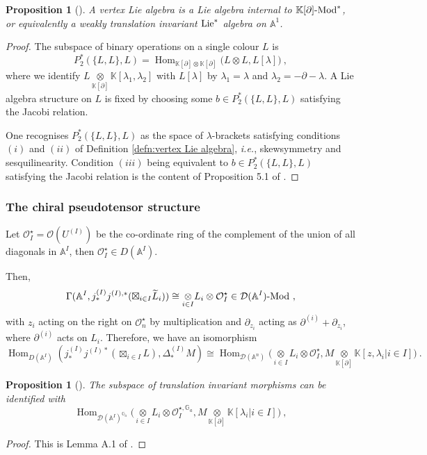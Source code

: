 \documentclass[11pt]{amsart}
\numberwithin{equation}{section}
\newtheorem{prop}[theo]{Proposition}
\theoremstyle{definition}
\newcommand{\bb}{\mathbb}
\newcommand{\mc}{\mathcal}
\DeclareMathOperator{\Hom}{Hom}
\newcommand{\ik}{{\bb K}}
\newcommand{\Lie}{{\textup{Lie}}}
\newcommand{\0}{{\textbf{0}}}
\newcommand{\DD}{{D}}
\def\IA{\mathbb{A}}
\def\IG{\mathbb{G}}
\def\OO{{\mc O}}
\def \ie{{\it i.e.}}
\newcommand{\tensor}[1]{\underset{#1}{\otimes}}
\begin{document}
\begin{prop}[\cite{BD1,BDSHK19}]\label{prop:Lie star is vertex Lie}
	A vertex Lie algebra is a Lie algebra internal to $\ik[\partial]\textup{-Mod}^*$, or equivalently a weakly translation invariant $\Lie^*$ algebra on $\IA^1$.
\end{prop}
\begin{proof}
 The subspace of binary operations on a single colour $L$ is
 \[
 P_2^*(\{L,L\},L) = \Hom_{\ik[\partial]\otimes\ik[\partial]}\big(L\otimes L, L[\lambda]\big)~,
 \]
 where we identify $L\tensor{\ik[\partial]}\ik[\lambda_1,\lambda_2]$ with $L[\lambda]$ by $\lambda_1=\lambda$ and $\lambda_2= -\partial-\lambda$. A Lie algebra structure on $L$ is fixed by choosing some $b\in P_2^*(\{L,L\},L)$ satisfying the Jacobi relation.

 One recognises $P_2^*(\{L,L\},L)$ as the space of $\lambda$-brackets satisfying conditions $(i)$ and $(ii)$ of Definition \ref{defn:vertex Lie algebra}, \ie, skewsymmetry and sesquilinearity. Condition $(iii)$ being equivalent to $b\in P_2^*(\{L,L\},L)$ satisfying the Jacobi relation is the content of Proposition 5.1 of \cite{BDSHK19}.
\end{proof}

\subsubsection{The chiral pseudotensor structure} 
Let $\OO_I^\star= \OO(U^{(I)})$ be the co-ordinate ring of the complement of the union of all diagonals in $\IA^I$, then $\OO_I^\star\in \DD(\IA^I)$.

Then,
\[
\Gamma(\IA^I,j^{(I)}_*j^{(I),*}(\boxtimes_{i\in I} \widetilde{L}_i)) \cong\tensor{i\in I} L_i\otimes \OO_I^{\star}\in \mc{D}(\IA^I)\textup{-Mod}~,
\]
with $z_i$ acting on the right on $\OO_n^\star$ by multiplication and $\partial_{z_i}$ acting as $\partial^{(i)} + \partial_{z_i}$, where $\partial^{(i)}$ acts on $L_i$. Therefore, we have an isomorphism
\[
 \Hom_{D(\IA^I)}(j^{(I)}_*j^{(I)*}(\boxtimes_{i\in I} L),\Delta^{(I)}_*M) \cong \Hom_{{\mc D}(\IA^n)}\big(\tensor{i\in I} L_i\otimes \OO_I^\star, M\tensor{\ik[\partial]}\ik[z,\lambda_i|i\in I]\big)~.
\]

\begin{prop}[\cite{BDSHK19}]
The subspace of translation invariant morphisms can be identified with
\[
 \Hom_{{\mc D}(\IA^I)^{\IG_a}}\big(\tensor{i\in I} L_i\otimes \OO_I^{\star,\IG_a}, M\tensor{\ik[\partial]}\ik[\lambda_i|i\in I]\big)~,
\]
\end{prop}
\begin{proof}
	This is Lemma A.1 of \cite{BDSHK19}.
\end{proof}
\end{document}
